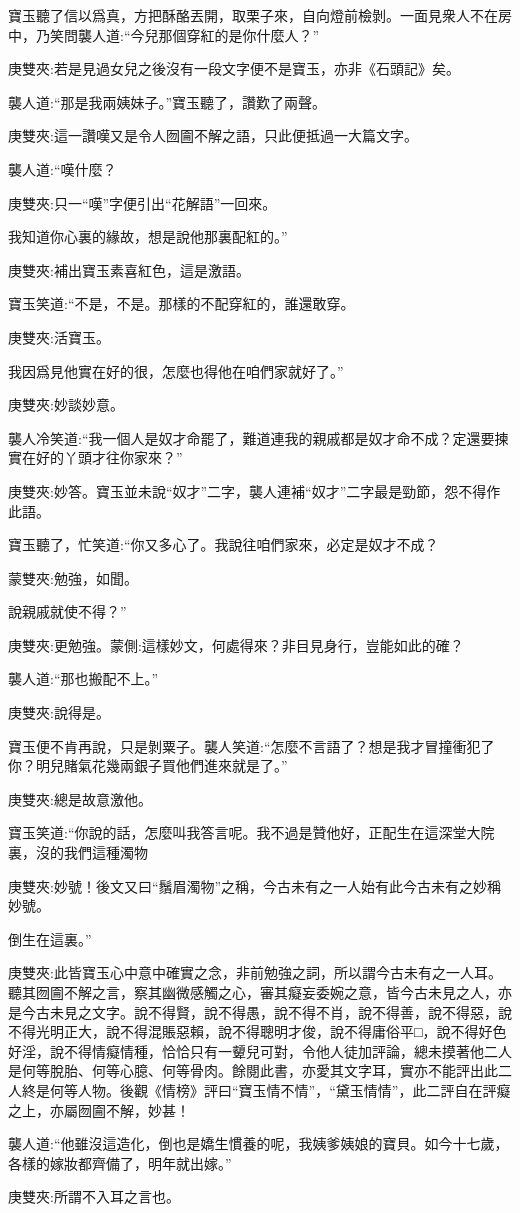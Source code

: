 \begin{parag}
    寶玉聽了信以爲真，方把酥酪丟開，取栗子來，自向燈前檢剝。一面見衆人不在房中，乃笑問襲人道:“今兒那個穿紅的是你什麼人？”\begin{note}庚雙夾:若是見過女兒之後沒有一段文字便不是寶玉，亦非《石頭記》矣。\end{note}襲人道:“那是我兩姨妹子。”寶玉聽了，讚歎了兩聲。\begin{note}庚雙夾:這一讚嘆又是令人囫圇不解之語，只此便抵過一大篇文字。\end{note}襲人道:“嘆什麼？\begin{note}庚雙夾:只一“嘆”字便引出“花解語”一回來。\end{note}我知道你心裏的緣故，想是說他那裏配紅的。”\begin{note}庚雙夾:補出寶玉素喜紅色，這是激語。\end{note}寶玉笑道:“不是，不是。那樣的不配穿紅的，誰還敢穿。\begin{note}庚雙夾:活寶玉。\end{note}我因爲見他實在好的很，怎麼也得他在咱們家就好了。”\begin{note}庚雙夾:妙談妙意。\end{note}襲人冷笑道:“我一個人是奴才命罷了，難道連我的親戚都是奴才命不成？定還要揀實在好的丫頭才往你家來？”\begin{note}庚雙夾:妙答。寶玉並未說“奴才”二字，襲人連補“奴才”二字最是勁節，怨不得作此語。\end{note}寶玉聽了，忙笑道:“你又多心了。我說往咱們家來，必定是奴才不成？\begin{note}蒙雙夾:勉強，如聞。\end{note}說親戚就使不得？”\begin{note}庚雙夾:更勉強。蒙側:這樣妙文，何處得來？非目見身行，豈能如此的確？\end{note}襲人道:“那也搬配不上。”\begin{note}庚雙夾:說得是。\end{note}寶玉便不肯再說，只是剝粟子。襲人笑道:“怎麼不言語了？想是我才冒撞衝犯了你？明兒賭氣花幾兩銀子買他們進來就是了。”\begin{note}庚雙夾:總是故意激他。\end{note}寶玉笑道:“你說的話，怎麼叫我答言呢。我不過是贊他好，正配生在這深堂大院裏，沒的我們這種濁物\begin{note}庚雙夾:妙號！後文又曰“鬚眉濁物”之稱，今古未有之一人始有此今古未有之妙稱妙號。\end{note}倒生在這裏。”\begin{note}庚雙夾:此皆寶玉心中意中確實之念，非前勉強之詞，所以謂今古未有之一人耳。聽其囫圇不解之言，察其幽微感觸之心，審其癡妄委婉之意，皆今古未見之人，亦是今古未見之文字。說不得賢，說不得愚，說不得不肖，說不得善，說不得惡，說不得光明正大，說不得混賬惡賴，說不得聰明才俊，說不得庸俗平□，說不得好色好淫，說不得情癡情種，恰恰只有一顰兒可對，令他人徒加評論，總未摸著他二人是何等脫胎、何等心臆、何等骨肉。餘閱此書，亦愛其文字耳，實亦不能評出此二人終是何等人物。後觀《情榜》評曰“寶玉情不情”，“黛玉情情”，此二評自在評癡之上，亦屬囫圇不解，妙甚！\end{note}襲人道:“他雖沒這造化，倒也是嬌生慣養的呢，我姨爹姨娘的寶貝。如今十七歲，各樣的嫁妝都齊備了，明年就出嫁。”\begin{note}庚雙夾:所謂不入耳之言也。\end{note}

\end{parag}
